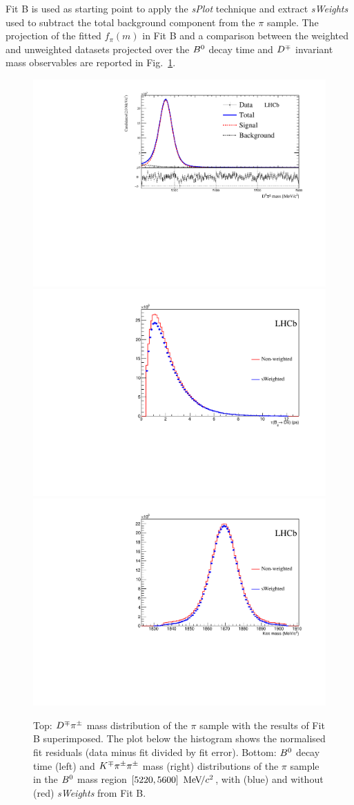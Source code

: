Fit B is used as starting point to apply the \emph{sPlot} technique and extract
\emph{sWeights} used to subtract the total background component from the $\pi$
sample. The projection of the fitted $f_{\pi}(m)$ in Fit B and a comparison
between the weighted and unweighted datasets projected over the $B^0$ decay time
and $D^\mp$ invariant mass observables are reported in Fig.~\ref{fig:sWeightComp}.
\begin{figure}[t]
	\begin{center}
		\includegraphics[width=0.65\linewidth]{03Massfit/figs/MDFitPlots_Bd/MDFitForSWeights_BeautyMass_Bd2DPi.pdf} \\
		\includegraphics[width=0.45\linewidth]{03Massfit/figs/MDFitPlots_Bd/sWeightedDistribution_BeautyTime.pdf}
		\includegraphics[width=0.45\linewidth]{03Massfit/figs/MDFitPlots_Bd/sWeightedDistribution_CharmMass.pdf}
	\end{center}
        \vspace{-2mm}
	\caption{Top: $D^\mp\pi^\pm$ mass distribution of the $\pi$ sample with the results of Fit B superimposed. 
	The plot below the histogram shows the normalised fit residuals (data minus fit divided by fit error). Bottom: $B^0$ decay time (left) and $K^\mp\pi^\pm\pi^\pm$ mass (right) distributions of the $\pi$
	sample in the $B^0$ mass region $[5220,5600]~{\mathrm{\,Me\kern -0.1em V\!/}c^2}$, with (blue) and without (red) \emph{sWeights} from Fit B.}
	\label{fig:sWeightComp}
\end{figure}

